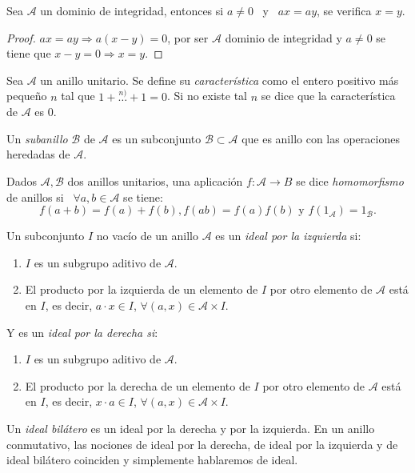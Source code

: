 \begin{proposicion}
    Sea $\mathcal{A}$ un dominio de integridad, entonces si $a \neq 0$ \ y \ $ax = ay$, se verifica $x = y$.
\end{proposicion}

\begin{proof}
    $ax = ay \Rightarrow a(x-y) = 0$, por ser $\mathcal{A}$ dominio de integridad y $a \neq 0$ se tiene que $x-y = 0 \Rightarrow x=y$.
\end{proof}

\begin{definicion}
Sea $\mathcal{A}$ un anillo unitario. Se define su \emph{característica} como el entero positivo más pequeño $n$ tal que $ 1 + {\overset {n)}{\ldots }}+1=0$. Si no existe tal $n$ se dice que la característica de $\mathcal{A}$ es $0$.
\end{definicion}

\begin{definicion}
    Un \emph{subanillo} $\mathcal{B}$ de $\mathcal{A}$ es un subconjunto $\mathcal{B} \subset \mathcal{A}$ que es anillo con las operaciones heredadas de $\mathcal{A}$.
\end{definicion}

\begin{definicion}
Dados $\mathcal{A},\mathcal{B}$ dos anillos unitarios, una aplicación $f: \mathcal{A} \rightarrow B$ se dice \emph{homomorfismo} de anillos si \ $\forall a,b \in \mathcal{A}$ se tiene:
$$f(a + b) = f(a) + f(b), f(ab) = f(a)f(b) \text{ y } f(1_\mathcal{A}) = 1_\mathcal{B}.$$
\end{definicion}

\begin{definicion}
Un subconjunto $I$ no vacío de un anillo $\mathcal{A}$ es un \emph{ideal por la izquierda} si:
    \begin{enumerate}
        \item $I$ es un subgrupo aditivo de $\mathcal{A}$.
        \item El producto por la izquierda de un elemento de $I$ por otro elemento de $\mathcal{A}$ está en $I$, es decir, $a\cdot x \in I$, $\forall (a,x) \in \mathcal{A} \times I.$
    \end{enumerate}
    Y es un \emph{ideal por la derecha si}: 
    \begin{enumerate}
        \item $I$ es un subgrupo aditivo de $\mathcal{A}$.
        \item El producto por la derecha de un elemento de $I$ por otro elemento de $\mathcal{A}$ está en $I$, es decir, $x\cdot a \in I$, $\forall (a,x) \in \mathcal{A} \times I.$
    \end{enumerate}
    Un \emph{ideal bilátero} es un ideal por la derecha y por la izquierda. En un anillo conmutativo, las nociones de ideal por la derecha, de ideal por la izquierda y de ideal bilátero coinciden y simplemente hablaremos de ideal.
\end{definicion}

